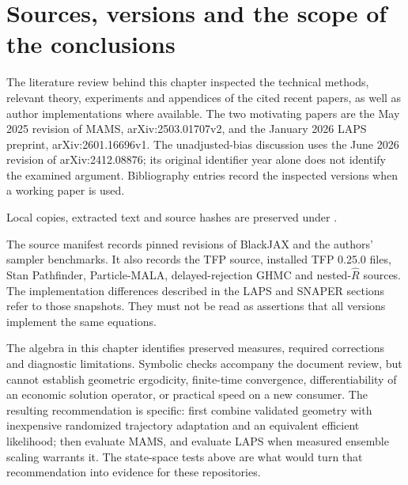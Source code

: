 \section{Sources, versions and the scope of the conclusions}
\label{sec:bf-modern-sources}

The literature review behind this chapter inspected the technical methods,
relevant theory, experiments and appendices of the cited recent papers, as
well as author implementations where available. The two motivating papers
are the May 2025 revision of MAMS, arXiv:2503.01707v2, and the January 2026
LAPS preprint, arXiv:2601.16696v1. The unadjusted-bias discussion uses the
June 2026 revision of arXiv:2412.08876; its original identifier year alone
does not identify the examined argument. Bibliography entries record the
inspected versions when a working paper is used.

Local copies, extracted text and source hashes are preserved under
.

The source manifest records pinned revisions of BlackJAX and the authors'
sampler benchmarks. It also records the TFP source, installed TFP 0.25.0
files, Stan Pathfinder, Particle-MALA, delayed-rejection GHMC and
nested-$\widehat R$ sources.
The implementation differences described in the LAPS and SNAPER sections
refer to those snapshots. They must not be read as assertions that all
versions implement the same equations.

The algebra in this chapter identifies preserved measures, required
corrections and diagnostic limitations. Symbolic checks accompany the
document review, but cannot establish geometric ergodicity, finite-time
convergence, differentiability of an economic solution operator, or practical
speed on a new consumer. The resulting recommendation is specific: first
combine validated geometry with inexpensive randomized trajectory adaptation
and an equivalent efficient likelihood; then evaluate MAMS, and evaluate LAPS
when measured ensemble scaling warrants it. The state-space tests above are
what would turn that recommendation into evidence for these repositories.
